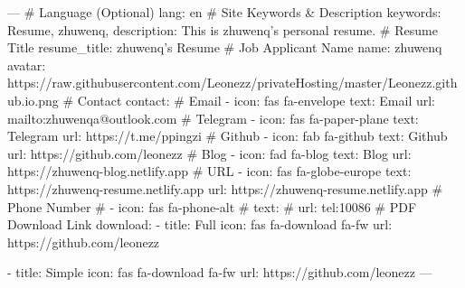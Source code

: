 ---
# Language (Optional)
lang: en
# Site Keywords & Description
keywords: Resume, zhuwenq,
description: This is zhuwenq's personal resume.
# Resume Title
resume_title: zhuwenq's Resume
# Job Applicant Name
name: zhuwenq
avatar: https://raw.githubusercontent.com/Leonezz/privateHosting/master/Leonezz.github.io.png
# Contact
contact:
  # Email
  - icon: fas fa-envelope
    text: Email
    url: mailto:zhuwenqa@outlook.com
  # Telegram
  - icon: fas fa-paper-plane
    text: Telegram
    url: https://t.me/ppingzi
  # Github
  - icon: fab fa-github
    text: Github
    url: https://github.com/leonezz
  # Blog
  - icon: fad fa-blog
    text: Blog
    url: https://zhuwenq-blog.netlify.app
  # URL
  - icon: fas fa-globe-europe
    text: https://zhuwenq-resume.netlify.app
    url: https://zhuwenq-resume.netlify.app
  # Phone Number
#  - icon: fas fa-phone-alt
#    text: 
#    url: tel:10086
# PDF Download Link
download:
  - title: Full
    icon: fas fa-download fa-fw
    url: https://github.com/leonezz

  - title: Simple
    icon: fas fa-download fa-fw
    url: https://github.com/leonezz
---

